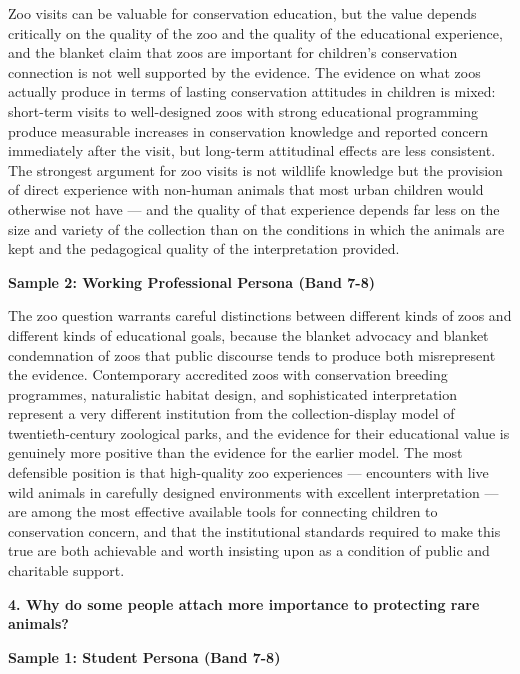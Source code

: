 Zoo visits can be valuable for conservation education, but the value depends critically on the quality of the zoo and the quality of the educational experience, and the blanket claim that zoos are important for children's conservation connection is not well supported by the evidence. The evidence on what zoos actually produce in terms of lasting conservation attitudes in children is mixed: short-term visits to well-designed zoos with strong educational programming produce measurable increases in conservation knowledge and reported concern immediately after the visit, but long-term attitudinal effects are less consistent. The strongest argument for zoo visits is not wildlife knowledge but the provision of direct experience with non-human animals that most urban children would otherwise not have — and the quality of that experience depends far less on the size and variety of the collection than on the conditions in which the animals are kept and the pedagogical quality of the interpretation provided.

\textbf{Sample 2: Working Professional Persona (Band 7-8)}

The zoo question warrants careful distinctions between different kinds of zoos and different kinds of educational goals, because the blanket advocacy and blanket condemnation of zoos that public discourse tends to produce both misrepresent the evidence. Contemporary accredited zoos with conservation breeding programmes, naturalistic habitat design, and sophisticated interpretation represent a very different institution from the collection-display model of twentieth-century zoological parks, and the evidence for their educational value is genuinely more positive than the evidence for the earlier model. The most defensible position is that high-quality zoo experiences — encounters with live wild animals in carefully designed environments with excellent interpretation — are among the most effective available tools for connecting children to conservation concern, and that the institutional standards required to make this true are both achievable and worth insisting upon as a condition of public and charitable support.

\separator

\begin{ieltsquestion}
\textbf{4. Why do some people attach more importance to protecting rare animals?}
\end{ieltsquestion}
\textbf{Sample 1: Student Persona (Band 7-8)}

